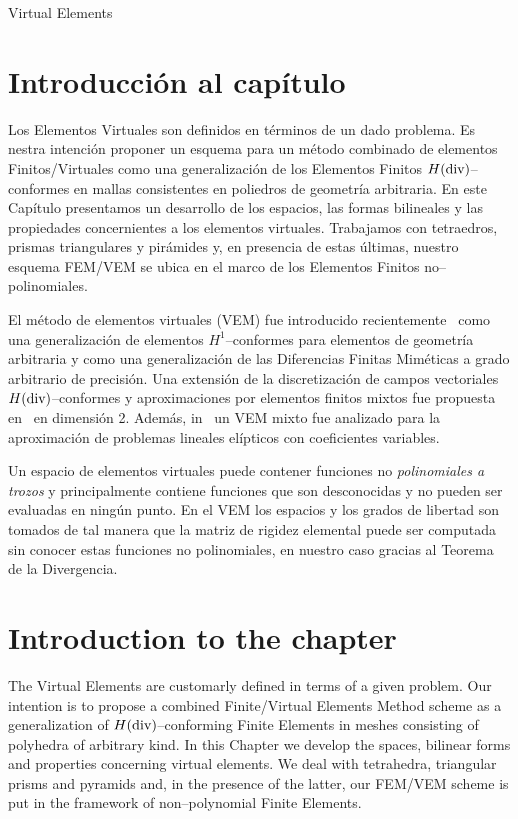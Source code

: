 \begin{chapter}{Virtual Elements}
\section*{Introducci\'on al cap\'itulo}
Los Elementos Virtuales son definidos en t\'erminos de un dado problema. 
Es nestra intenci\'on
proponer un esquema para un m\'etodo combinado 
de elementos Finitos/Virtuales
como una generalizaci\'on de los Elementos Finitos $H(\operatorname{\textrm{div}})$--conformes
en mallas consistentes en
poliedros de geometr\'ia arbitraria. En este
Cap\'itulo presentamos un desarrollo de los espacios, las formas
bilineales y las propiedades concernientes a los  
elementos virtuales.
Trabajamos con tetraedros, prismas triangulares y pir\'amides y,
en presencia de estas \'ultimas,
nuestro esquema FEM/VEM se ubica en
el marco de los Elementos Finitos no--polinomiales.

El m\'etodo de elementos virtuales (VEM) 
fue introducido recientemente~\cite{MR2997471}
como una generalizaci\'on de elementos $H^1$--conformes 
para elementos de geometr\'ia arbitraria y como una
generalizaci\'on de las Diferencias Finitas Mim\'eticas
a grado arbitrario de precisi\'on. Una extensi\'on de 
la discretizaci\'on de campos vectoriales $H(\operatorname{\textrm{div}})$--conformes
y aproximaciones por elementos finitos mixtos
fue propuesta en~\cite{bfm} en dimensi\'on 2. 
Adem\'as, in~\cite{MR3507271} un VEM mixto
fue analizado
para la aproximaci\'on de 
problemas lineales el\'ipticos con coeficientes variables.

Un espacio de elementos virtuales puede contener funciones
no \emph{polinomiales a trozos}
y principalmente contiene funciones
que son desconocidas y no pueden ser evaluadas en ning\'un punto.
En el VEM los espacios y los grados de libertad son tomados de tal manera
que la matriz de rigidez elemental puede ser computada
sin conocer estas funciones no polinomiales, en nuestro caso gracias 
al Teorema de la Divergencia.

\section*{Introduction to the chapter}
The Virtual Elements are customarly defined in terms of a given problem. Our
intention 
is to propose a combined Finite/Virtual Elements Method scheme
as a generalization of $H(\operatorname{\textrm{div}})$--conforming Finite Elements
in meshes consisting of polyhedra of arbitrary kind. In this Chapter we develop
the spaces, bilinear forms and properties concerning 
virtual elements.
We deal with tetrahedra, triangular prisms and pyramids and, in the presence of
the latter, our FEM/VEM scheme is put in the framework of 
non--polynomial Finite Elements.


\end{chapter}
